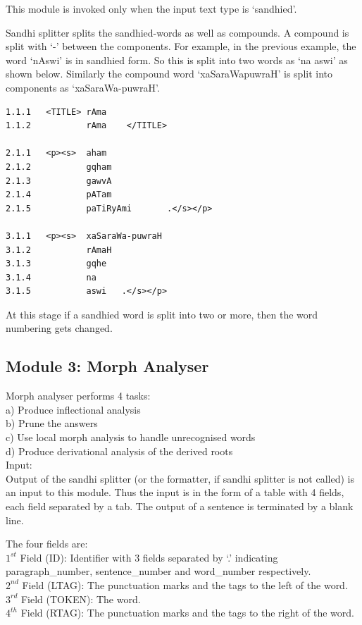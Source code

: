 \documentclass{llncs}
\begin{document}
\noindent 
This module is invoked only when the input text type is `sandhied'. 

\noindent 
Sandhi splitter splits the sandhied-words as well as compounds. A compound is split with `-' between the components.
For example, in the previous example, the  word `nAswi' is in sandhied form.
So this is split into two words as `na aswi' as shown below. Similarly the compound word `xaSaraWapuwraH' is split into components as `xaSaraWa-puwraH'.

\begin{verbatim}
1.1.1   <TITLE> rAma
1.1.2           rAma    </TITLE>

2.1.1   <p><s>  aham
2.1.2           gqham
2.1.3           gawvA
2.1.4           pATam
2.1.5           paTiRyAmi       .</s></p>

3.1.1   <p><s>  xaSaraWa-puwraH
3.1.2           rAmaH
3.1.3           gqhe
3.1.4           na
3.1.5           aswi   .</s></p>
\end{verbatim}

\noindent 
At this stage if a sandhied word is split into two or more, then the word numbering gets changed.

\subsection{Module 3: Morph Analyser}

\noindent 
Morph analyser performs 4 tasks:\\
a) Produce inflectional analysis\\
b) Prune the answers\\
c) Use local morph analysis to handle unrecognised words\\
d) Produce derivational analysis of the derived roots\\

\noindent 
Input: \\
Output of the sandhi splitter (or the formatter, if sandhi splitter is not called) is an input to this module. Thus the input is in the form of a table with 4 fields, each field separated by a tab. The output of a sentence is terminated by a blank line.

\noindent 
The four fields are:\\
$1^{st}$ Field (ID): Identifier with 3 fields separated by `.' indicating paragraph\_number, sentence\_number and word\_number respectively.\\
$2^{nd}$ Field (LTAG): The punctuation marks and the tags to the left of the word.\\
$3^{rd}$ Field (TOKEN): The word.\\
$4^{th}$ Field (RTAG): The punctuation marks and the tags to the right of the word.\\
\end{document}
